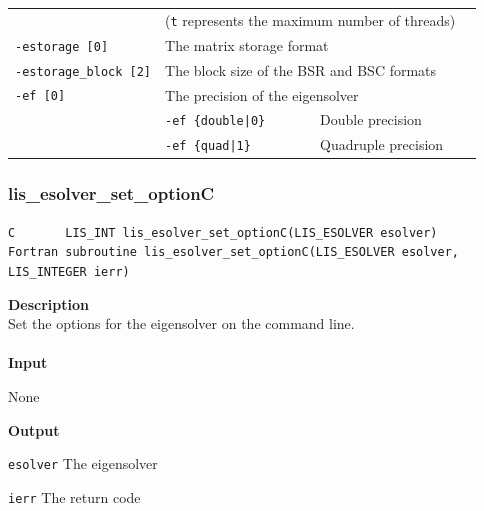 \documentclass[a4paper]{article}
\newcommand{\namelistlabel}[1]{\mbox{#1}\hfill}
\newenvironment{namelist}[1]{%
\begin{list}{}
  {\let\makelabel\namelistlabel
  \settowidth{\labelwidth}{#1}
  \setlength{\leftmargin}{1.1\labelwidth}}
  }{%
\end{list}}
\begin{document}
\begin{minipage}[t]{\textwidth}
\begin{center}
\begin{tabular}{l|ll}
                            & (\verb=t= represents the maximum number of
 threads) \\
\verb=-estorage [0]=   & The matrix storage format \\
\verb=-estorage_block [2]=& The block size of the BSR and BSC formats\\ 
\verb=-ef [0]=         & The precision of the eigensolver\\
                       & \verb=-ef {double|0}       =  Double precision \\ 
                       & \verb=-ef {quad|1}         =  Quadruple precision \\
\hline         
\end{tabular}
\end{center}
\end{minipage}

\newpage
\subsubsection{lis\_esolver\_set\_optionC}
\begin{screen}
\verb|C       LIS_INT lis_esolver_set_optionC(LIS_ESOLVER esolver)|\\
\verb|Fortran subroutine lis_esolver_set_optionC(LIS_ESOLVER esolver, LIS_INTEGER ierr)|
\end{screen}
{\bf Description}\\
\indent
Set the options for the eigensolver on the command line.
\\ \\
\noindent
{\bf Input}
\begin{namelist}{XXXXXXXXXXXXXXXXXXXX}
\item[None]
\end{namelist}
{\bf Output}
\begin{namelist}{XXXXXXXXXXXXXXXXXXXX}
\item[\tt esolver] The eigensolver
\item[\tt ierr] The return code
\end{namelist}
\end{document}
